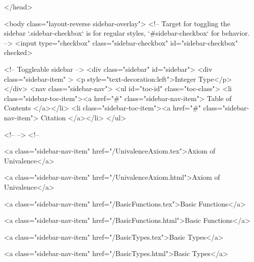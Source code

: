   
</head>




  <body class="layout-reverse sidebar-overlay">
    <!-- Target for toggling the sidebar `.sidebar-checkbox` is for regular
     styles, `#sidebar-checkbox` for behavior. -->
<input type="checkbox" class="sidebar-checkbox" id="sidebar-checkbox" checked>

<!-- Toggleable sidebar -->
<div class="sidebar" id="sidebar">
  <div class="sidebar-item" >
    <p style="text-decoration:left">Integer Type</p>
  </div>
  <nav class="sidebar-nav">
    <ul id="toc-id" class="toc-class">
  <li class="sidebar-toc-item"><a href="#" class="sidebar-nav-item"> Table of Contents </a></li>
  <li class="sidebar-toc-item"><a href="#" class="sidebar-nav-item"> Citation </a></li>
</ul>


    <!--  -->
    <!-- 
      
    
      
    
      
    
      
    
      
        
      
    
      
        
          <a class="sidebar-nav-item" href="/UnivalenceAxiom.tex">Axiom of Univalence</a>
        
      
    
      
        
          <a class="sidebar-nav-item" href="/UnivalenceAxiom.html">Axiom of Univalence</a>
        
      
    
      
        
          <a class="sidebar-nav-item" href="/BasicFunctions.tex">Basic Functions</a>
        
      
    
      
        
          <a class="sidebar-nav-item" href="/BasicFunctions.html">Basic Functions</a>
        
      
    
      
        
          <a class="sidebar-nav-item" href="/BasicTypes.tex">Basic Types</a>
        
      
    
      
        
          <a class="sidebar-nav-item" href="/BasicTypes.html">Basic Types</a>
        
      
    
